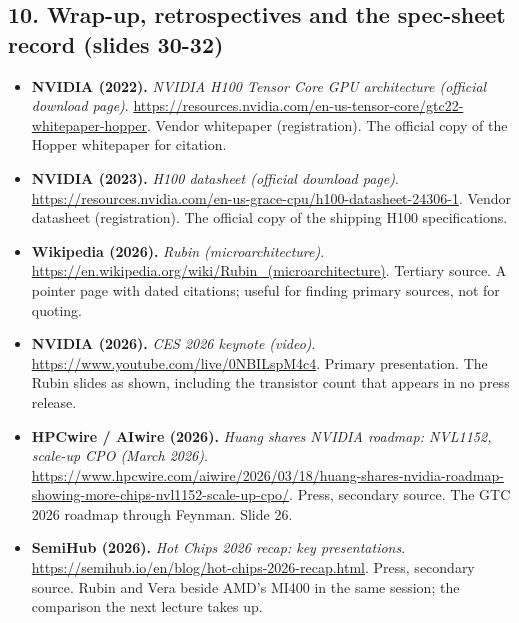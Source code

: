 \subsection*{10. Wrap-up, retrospectives and the spec-sheet record (slides 30-32)}
\begin{itemize}[leftmargin=1.2em,itemsep=3pt]\sloppy
\item \textbf{NVIDIA (2022).} \textit{NVIDIA H100 Tensor Core GPU architecture (official download page)}. \url{https://resources.nvidia.com/en-us-tensor-core/gtc22-whitepaper-hopper}. Vendor whitepaper (registration). The official copy of the Hopper whitepaper for citation.
\item \textbf{NVIDIA (2023).} \textit{H100 datasheet (official download page)}. \url{https://resources.nvidia.com/en-us-grace-cpu/h100-datasheet-24306-1}. Vendor datasheet (registration). The official copy of the shipping H100 specifications.
\item \textbf{Wikipedia (2026).} \textit{Rubin (microarchitecture)}. \url{https://en.wikipedia.org/wiki/Rubin_(microarchitecture)}. Tertiary source. A pointer page with dated citations; useful for finding primary sources, not for quoting.
\item \textbf{NVIDIA (2026).} \textit{CES 2026 keynote (video)}. \url{https://www.youtube.com/live/0NBILspM4c4}. Primary presentation. The Rubin slides as shown, including the transistor count that appears in no press release.
\item \textbf{HPCwire / AIwire (2026).} \textit{Huang shares NVIDIA roadmap: NVL1152, scale-up CPO (March 2026)}. \url{https://www.hpcwire.com/aiwire/2026/03/18/huang-shares-nvidia-roadmap-showing-more-chips-nvl1152-scale-up-cpo/}. Press, secondary source. The GTC 2026 roadmap through Feynman. Slide 26.
\item \textbf{SemiHub (2026).} \textit{Hot Chips 2026 recap: key presentations}. \url{https://semihub.io/en/blog/hot-chips-2026-recap.html}. Press, secondary source. Rubin and Vera beside AMD's MI400 in the same session; the comparison the next lecture takes up.
\end{itemize}
